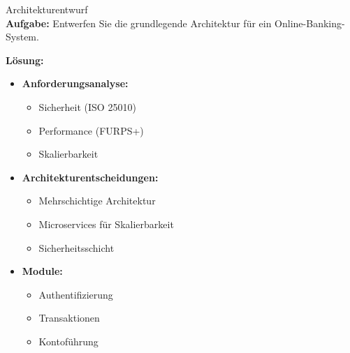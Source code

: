 \begin{example2}{Architekturentwurf}\\
\textbf{Aufgabe:} Entwerfen Sie die grundlegende Architektur für ein Online-Banking-System.

\textbf{Lösung:}
\begin{itemize}
    \item \textbf{Anforderungsanalyse:}
    \begin{itemize}
        \item Sicherheit (ISO 25010)
        \item Performance (FURPS+)
        \item Skalierbarkeit
    \end{itemize}
    
    \item \textbf{Architekturentscheidungen:}
    \begin{itemize}
        \item Mehrschichtige Architektur
        \item Microservices für Skalierbarkeit
        \item Sicherheitsschicht
    \end{itemize}
    
    \item \textbf{Module:}
    \begin{itemize}
        \item Authentifizierung
        \item Transaktionen
        \item Kontoführung
    \end{itemize}
\end{itemize}
\end{example2}

